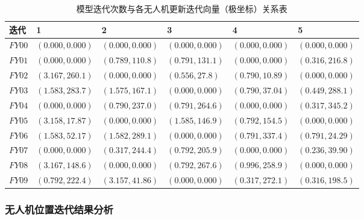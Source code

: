\documentclass{my_paper}
\begin{document}
\begin{table}[h]%
    \centering
    \caption{模型迭代次数与各无人机更新迭代向量（极坐标）关系表}
    \begin{tabular}{p{1.0cm}<{\centering}p{2.3cm}<{\centering}p{2.3cm}<{\centering}p{2.3cm}<{\centering}p{2.3cm}<{\centering}p{2.3cm}<{\centering}}
        \hline
        迭代     & 1 & 2 & 3& 4 &   5  \\
        \hline
        $FY00$ & $ (0.000, 0.000) $& $(0.000, 0.000)$& $(0.000, 0.000)$& $(0.000, 0.000)$ &$(0.000, 0.000)$\\
          $FY01$ & $ (0.000, 0.000) $&  $(0.789, 110.8)$& $(0.791,131.1)$ &$(0.000, 0.000)$ &$(0.316, 216.8)$\\
           $FY02$ & $ (3.167, 260.1) $& $(0.000, 0.000)$& $(0.556,27.8)$& $(0.790, 10.89)$ &$(0.000, 0.000)$\\
            $FY03$ & $ (1.583, 283.7) $& $(1.575,167.1)$& $(0.000, 0.000)$& $(0.790, 37.04)$ &$(0.449, 288.1)$\\
             $FY04$ & $ (0.000, 0.000) $& $(0.790, 237.0)$& $(0.791, 264.6)$& $(0.000, 0.000)$ &$(0.317, 345.2)$\\
              $FY05$ & $ (3.158, 17.87) $& $(0.000, 0.000)$& $(1.585, 146.9)$& $(0.792, 154.5)$ &$(0.000, 0.000)$\\
               $FY06$ & $ (1.583, 52.17) $& $(1.582, 289.1)$& $(0.000, 0.000)$& $(0.791, 337.4)$ &$(0.791, 24.29)$\\
                $FY07$ & $ (0.000, 0.000) $& $(0.317, 244.4)$& $(0.792, 205.9)$& $(0.000, 0.000)$ &$(0.236, 39.90)$\\
                 $FY08$ & $ (3.167, 148.6) $& $(0.000, 0.000)$& $(0.792, 267.6)$& $(0.996, 258.9)$ &$(0.000, 0.000)$\\
                   $FY09$ & $ (0.792, 222.4) $& $(3.157, 41.86)$& $(0.000, 0.000)$& $(0.317, 272.1)$ &$(0.316, 198.5)$\\
             
        \hline
    \end{tabular}
    \label{table2}
\end{table}





\subsubsection{无人机位置迭代结果分析}
\end{document}
